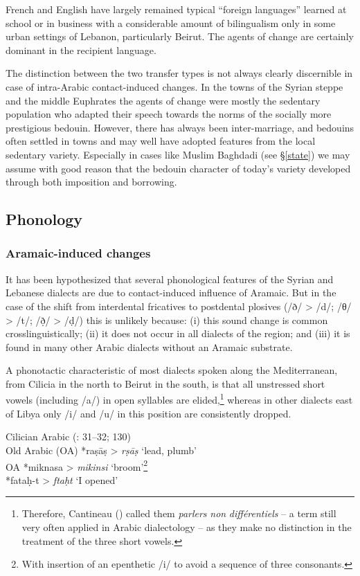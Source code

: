 \documentclass[output=paper]{langsci/langscibook}
\begin{document}
French and English have largely remained typical “foreign languages” learned at school or in business with a considerable amount of bilingualism only in some urban settings of Lebanon, particularly Beirut. The agents of change are certainly dominant in the recipient language. 

The distinction between the two transfer types is not always clearly discernible in case of intra-Arabic contact-induced changes. In the towns of the Syrian steppe and the middle Euphrates the agents of change were mostly the sedentary population who adapted their speech towards the norms of the socially more prestigious bedouin. However, there has always been inter-marriage, and bedouins often settled in towns and may well have adopted features from the local sedentary variety. Especially in cases like Muslim Baghdadi (see §\ref{state}) we may assume with good reason that the bedouin character of today’s variety developed through both imposition and borrowing. 

  \subsection{Phonology} 
 \subsubsection{Aramaic-induced changes} 

It has been hypothesized that several phonological features of the Syrian and Lebanese dialects are due to contact-induced influence of Aramaic. But in the case of the shift from interdental fricatives to postdental plosives (/ð/ > /d/; /θ/ > /t/; /ð̣/ > /ḍ/) this is unlikely because: (i) this sound change is common crosslinguistically; (ii) it does not occur in all dialects of the region; and (iii) it is found in many other Arabic dialects without an Aramaic substrate. 

A phonotactic characteristic of most dialects spoken along the Mediterranean, from Cilicia in the north to Beirut in the south, is that all unstressed short vowels (including /a/) in open syllables are elided,\footnote{Therefore, Cantineau (\citeyear[108]{Cantineau1960book}) called them \textit{parlers} \textit{non} \textit{différentiels} – a term still very often applied in Arabic dialectology – as they make no distinction in the treatment of the three short vowels.} whereas in other dialects east of Libya only /i/ and /u/ in this position are consistently dropped.

\ea
{Cilician Arabic (\citealt{Procházka2002Cukurova}: 31--32; 130)}\\
  \textup{Old Arabic (OA)} *raṣāṣ > \textit{rṣāṣ}  \textup{‘lead, plumb’\\
OA} *miknasa > \textit{mikinsi} ‘\textup{broom’}\footnote{With insertion of an epenthetic /i/ to avoid a sequence of three consonants.}\\
*fataḥ-t > \textit{ftaḥt} ‘\textup{I opened’}\\
  \z
  
\end{document}
